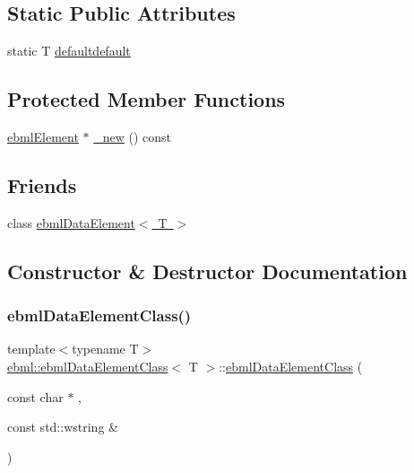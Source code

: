 \subsection*{Static Public Attributes}
\begin{DoxyCompactItemize}
\item 
static T \mbox{\hyperlink{classebml_1_1ebmlDataElementClass_aa58b82cbc57d5ba83c54e845cf354bb5}{defaultdefault}}
\end{DoxyCompactItemize}
\subsection*{Protected Member Functions}
\begin{DoxyCompactItemize}
\item 
\mbox{\hyperlink{classebml_1_1ebmlElement}{ebml\+Element}} $\ast$ \mbox{\hyperlink{classebml_1_1ebmlDataElementClass_a022ddc37a9bf678de66dab9157d08b9a}{\+\_\+new}} () const
\end{DoxyCompactItemize}
\subsection*{Friends}
\begin{DoxyCompactItemize}
\item 
class \mbox{\hyperlink{classebml_1_1ebmlDataElementClass_a817c43c32db8e0094e44cb83006f25ca}{ebml\+Data\+Element$<$ T $>$}}
\end{DoxyCompactItemize}


\subsection{Constructor \& Destructor Documentation}
\mbox{\label{classebml_1_1ebmlDataElementClass_a9fc67c00537acbd8c4e67c62d4e8a877}} 
\subsubsection{\texorpdfstring{ebml\+Data\+Element\+Class()}{ebmlDataElementClass()}\hspace{0.1cm}{\footnotesize\ttfamily [1/6]}}
{\footnotesize\ttfamily template$<$typename T$>$ \\
\mbox{\hyperlink{classebml_1_1ebmlDataElementClass}{ebml\+::ebml\+Data\+Element\+Class}}$<$ T $>$\+::\mbox{\hyperlink{classebml_1_1ebmlDataElementClass}{ebml\+Data\+Element\+Class}} (\begin{DoxyParamCaption}\item[{const char $\ast$}]{,  }\item[{const std\+::wstring \&}]{ }\end{DoxyParamCaption})}

